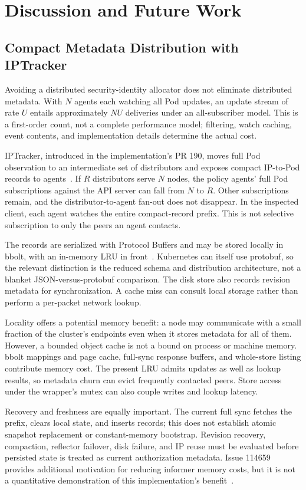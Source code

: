 \documentclass[letterpaper,twocolumn,10pt]{article}
\begin{document}
\section{Discussion and Future Work}
\subsection{Compact Metadata Distribution with IPTracker}
\label{sec:iptracker}
Avoiding a distributed security-identity allocator does not eliminate
distributed metadata. With $N$ agents each watching all Pod updates,
an update stream of rate $U$ entails approximately $NU$ deliveries
under an all-subscriber model. This is a first-order count, not a
complete performance model; filtering, watch caching, event contents,
and implementation details determine the actual cost.

IPTracker, introduced in the implementation's PR 190, moves full Pod
observation to an intermediate set of distributors and exposes compact
IP-to-Pod records to agents~\cite{iptracker190}. If $R$ distributors
serve $N$ nodes, the policy agents' full Pod subscriptions against the
API server can fall from $N$ to $R$. Other subscriptions remain, and
the distributor-to-agent fan-out does not disappear. In the inspected
client, each agent watches the entire compact-record prefix. This is
not selective subscription to only the peers an agent contacts.

The records are serialized with Protocol Buffers and may be stored
locally in bbolt, with an in-memory LRU in front~\cite{iptrackerbolt}.
Kubernetes can itself use protobuf, so the relevant distinction is
the reduced schema and distribution architecture, not a blanket
JSON-versus-protobuf comparison. The disk store also records revision
metadata for synchronization. A cache miss can consult local storage
rather than perform a per-packet network lookup.

Locality offers a potential memory benefit: a node may communicate
with a small fraction of the cluster's endpoints even when it stores
metadata for all of them. However, a bounded object cache is not
a bound on process or machine memory. bbolt mappings and page cache,
full-sync response buffers, and whole-store listing contribute memory
cost. The present LRU admits updates as well as lookup results, so
metadata churn can evict frequently contacted peers. Store access
under the wrapper's mutex can also couple writes and lookup latency.

Recovery and freshness are equally important. The current full sync
fetches the prefix, clears local state, and inserts records; this
does not establish atomic snapshot replacement or constant-memory
bootstrap. Revision recovery, compaction, reflector failover, disk
failure, and IP reuse must be evaluated before persisted state is
treated as current authorization metadata. Issue 114659 provides
additional motivation for reducing informer memory costs, but it is
not a quantitative demonstration of this implementation's
benefit~\cite{k8s114659}.
\end{document}
